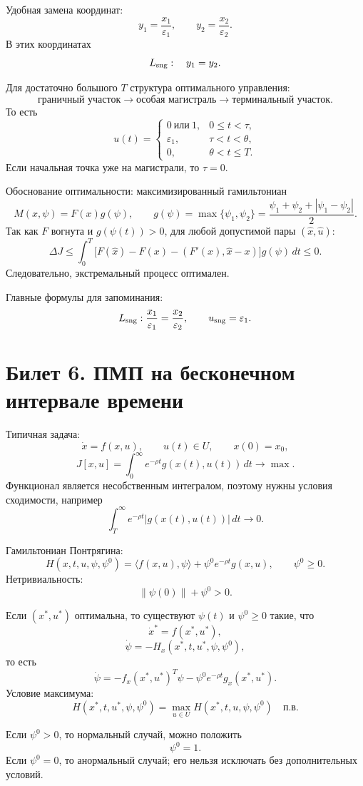 \documentclass[12pt,a4paper]{article}
\begin{document}
Удобная замена координат:
\[
y_1=\frac{x_1}{\varepsilon_1},
\qquad
y_2=\frac{x_2}{\varepsilon_2}.
\]
В этих координатах
\[
L_{\rm sng}:\quad y_1=y_2.
\]

Для достаточно большого $T$ структура оптимального управления:
\[
\text{граничный участок}\to \text{особая магистраль}\to \text{терминальный участок}.
\]
То есть
\[
u(t)=
\begin{cases}
0\ \text{или}\ 1, & 0\le t<\tau,\\
\varepsilon_1, & \tau<t<\theta,\\
0, & \theta<t\le T.
\end{cases}
\]
Если начальная точка уже на магистрали, то $\tau=0$.

Обоснование оптимальности: максимизированный гамильтониан
\[
M(x,\psi)=F(x)g(\psi),
\qquad
g(\psi)=\max\{\psi_1,\psi_2\}
=\frac{\psi_1+\psi_2+|\psi_1-\psi_2|}{2}.
\]
Так как $F$ вогнута и $g(\psi(t))>0$, для любой допустимой пары $(\widehat x,\widehat u)$:
\[
\Delta J\le
\int_0^T
\bigl[F(\widehat x)-F(x)-(F'(x),\widehat x-x)\bigr]g(\psi)\,dt\le0.
\]
Следовательно, экстремальный процесс оптимален.

Главные формулы для запоминания:
\[
L_{\rm sng}:\frac{x_1}{\varepsilon_1}=\frac{x_2}{\varepsilon_2},
\qquad
u_{\rm sng}=\varepsilon_1.
\]

\section*{Билет 6. ПМП на бесконечном интервале времени}

Типичная задача:
\[
\dot x=f(x,u),
\qquad
u(t)\in U,
\qquad
x(0)=x_0,
\]
\[
J[x,u]=\int_0^\infty e^{-\rho t}g(x(t),u(t))\,dt\to\max.
\]
Функционал является несобственным интегралом, поэтому нужны условия сходимости, например
\[
\int_T^\infty e^{-\rho t}|g(x(t),u(t))|\,dt\to0.
\]

Гамильтониан Понтрягина:
\[
H(x,t,u,\psi,\psi^0)=\langle f(x,u),\psi\rangle+
\psi^0e^{-\rho t}g(x,u),
\qquad \psi^0\ge0.
\]
Нетривиальность:
\[
\|\psi(0)\|+\psi^0>0.
\]

Если $(x^*,u^*)$ оптимальна, то существуют $\psi(t)$ и $\psi^0\ge0$ такие, что
\[
\dot x^*=f(x^*,u^*),
\]
\[
\dot\psi=-H_x(x^*,t,u^*,\psi,\psi^0),
\]
то есть
\[
\dot\psi= -f_x(x^*,u^*)^T\psi
-\psi^0 e^{-\rho t}g_x(x^*,u^*).
\]
Условие максимума:
\[
H(x^*,t,u^*,\psi,\psi^0)=\max_{u\in U}H(x^*,t,u,\psi,\psi^0)
\quad \text{п.в.}
\]

Если $\psi^0>0$, то нормальный случай, можно положить
\[
\psi^0=1.
\]
Если $\psi^0=0$, то анормальный случай; его нельзя исключать без дополнительных условий.
\end{document}
